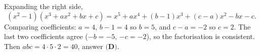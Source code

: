 Expanding the right side,
\[\left(x^2-1\right)\left(x^3+ax^2+bx+c\right)=x^5+ax^4+(b-1)x^3+(c-a)x^2-bx-c.\]
Comparing coefficients: $a=4$, $b-1=4$ so $b=5$, and $c-a=-2$ so $c=2$. The last two coefficients agree ($-b=-5$, $-c=-2$), so the factorisation is consistent. Then $abc=4\cdot5\cdot2=\boxed{40}$, answer $\textbf{(D)}$.

